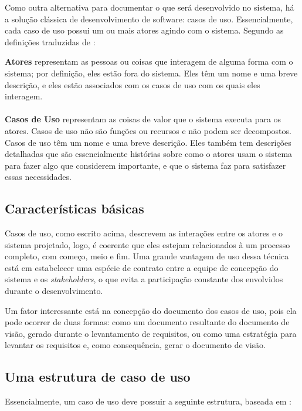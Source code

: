Como outra alternativa para documentar o que será desenvolvido no sistema, há a solução clássica de desenvolvimento de software: casos de uso. Essencialmente, cada caso de uso possui um ou mais atores agindo com o sistema. Segundo as definições traduzidas de \cite{kurtbittnerianspence2002}:

\begin{citacaoLonga}
\textbf{Atores} representam as pessoas ou coisas que interagem de alguma forma com o sistema; por definição, eles estão fora do sistema. Eles têm um nome e uma breve descrição, e eles estão associados com os casos de uso com os quais eles interagem.
\\
\\
\textbf{Casos de Uso} representam as coisas de valor que o sistema executa para os atores. Casos de uso não são funções ou recursos e não podem ser decompostos. Casos de uso têm um nome e uma breve descrição. Eles também tem descrições detalhadas que são essencialmente histórias sobre como o atores usam o sistema para fazer algo que considerem importante, e que o sistema faz para satisfazer essas necessidades.
\end{citacaoLonga}

\subsection{Características básicas}
Casos de uso, como escrito acima, descrevem as interações entre os atores e o sistema projetado, logo, é coerente que eles estejam relacionados à um processo completo, com começo, meio e fim. Uma grande vantagem de uso dessa técnica está em estabelecer uma espécie de contrato entre a equipe de concepção do sistema e os \textit{stakeholders}, o que evita a participação constante dos envolvidos durante o desenvolvimento.

Um fator interessante está na concepção do documento dos casos de uso, pois ela pode ocorrer de duas formas: como um documento resultante do documento de visão, gerado durante o levantamento de requisitos, ou como uma estratégia para levantar os requisitos e, como consequência, gerar o documento de visão\cite{elisayuminakagawa2013}.

\subsection{Uma estrutura de caso de uso}
Essencialmente, um caso de uso deve possuir a seguinte estrutura\cite{funpar2001}, baseada em \cite{ibm2011}:

